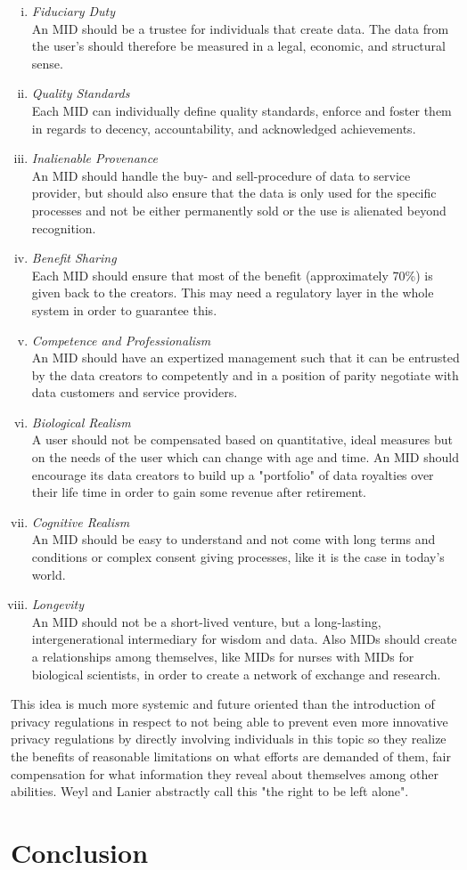 \documentclass[a4paper,12pt]{report}
\begin{document}
		\begin{enumerate}[(i)]
			\item \textit{Fiduciary Duty} \\
			An MID should be a trustee for individuals that create data. The data from the user's should therefore be measured in a legal, economic, and structural sense.
			\item \textit{Quality Standards} \\
			Each MID can individually define quality standards, enforce and foster them in regards to decency, accountability, and acknowledged achievements.
			\item \textit{Inalienable Provenance} \\
			An MID should handle the buy- and sell-procedure of data to service provider, but should also ensure that the data is only used for the specific processes and not be either permanently sold or the use is alienated beyond recognition.
			\item \textit{Benefit Sharing} \\
			Each MID should ensure that most of the benefit (approximately 70\%) is given back to the creators. This may need a regulatory layer in the whole system in order to guarantee this.
			\item \textit{Competence and Professionalism} \\
			An MID should have an expertized management such that it can be entrusted by the data creators to competently and in a position of parity negotiate with data customers and service providers.
			\item \textit{Biological Realism} \\
			A user should not be compensated based on quantitative, ideal measures but on the needs of the user which can change with age and time. An MID should encourage its data creators to build up a "portfolio" of data royalties over their life time in order to gain some revenue after retirement.
			\item \textit{Cognitive Realism} \\
			An MID should be easy to understand and not come with long terms and conditions or complex consent giving processes, like it is the case in today's world.
			\item \textit{Longevity} \\
			An MID should not be a short-lived venture, but a long-lasting, intergenerational intermediary for wisdom and data. Also MIDs should create a relationships among themselves, like MIDs for nurses with MIDs for biological scientists, in order to create a network of exchange and research.
		\end{enumerate}
		This idea is much more systemic and future oriented than the introduction of privacy regulations in respect to not being able to prevent even more innovative privacy regulations by directly involving individuals in this topic so they realize the benefits of reasonable limitations on what efforts are demanded of them, fair compensation for what information they reveal about themselves among other abilities. Weyl and Lanier abstractly call this "the right to be left alone".
	\closesection
	
	\chapter{Conclusion}
	
	\newpage
	\printbibliography
\end{document}
